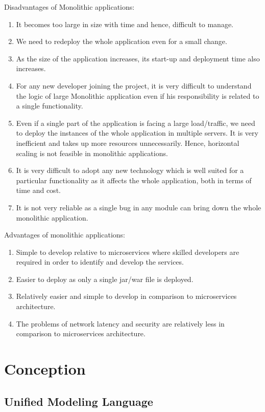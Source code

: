 Disadvantages of Monolithic applications:
\begin{enumerate}
    \item
          It becomes too large in size with time and hence, difficult to manage.
    \item
          We need to redeploy the whole application even for a small change.
    \item
          As the size of the application increases, its start-up and deployment time also increases.
    \item
          For any new developer joining the project, it is very difficult to understand the logic of large Monolithic application even if his responsibility is related to a single functionality.
    \item
          Even if a single part of the application is facing a large load/traffic, we need to deploy the instances of the whole application in multiple servers. It is very inefficient and takes up more resources unnecessarily. Hence, horizontal scaling is not feasible in monolithic applications.
    \item
          It is very difficult to adopt any new technology which is well suited for a particular functionality as it affects the whole application, both in terms of time and cost.
    \item
          It is not very reliable as a single bug in any module can bring down the whole monolithic application.
\end{enumerate}
Advantages of monolithic applications:
\begin{enumerate}
    \item
          Simple to develop relative to microservices where skilled developers are required in order to identify and develop the services.
    \item
          Easier to deploy as only a single jar/war file is deployed.
    \item
          Relatively easier and simple to develop in comparison to microservices architecture.
    \item
          The problems of network latency and security are relatively less in comparison to microservices architecture.
\end{enumerate}


\section{Conception}
\subsection{Unified Modeling Language}
